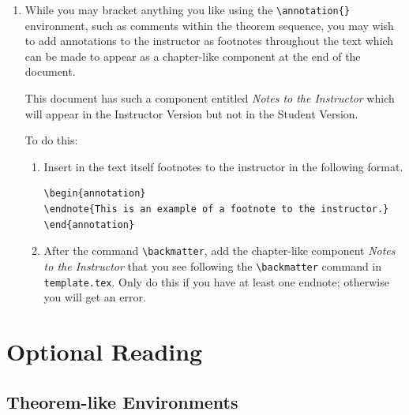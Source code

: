\begin{enumerate}
 \item While you may bracket anything you like using the \verb|\annotation{}| environment,
       such as comments within the theorem sequence, you may wish to add annotations
       to the instructor as footnotes throughout the text which can be made to appear as a chapter-like
       component at the end of the document.
\begin{annotation}
\end{annotation}
       This document has such a
       component entitled \emph{Notes to the Instructor} which will appear in the
       Instructor Version but not in the Student Version.
\begin{annotation}
\end{annotation}
       To do this:
       \begin{enumerate}
        \item  Insert in the text itself footnotes to the instructor
              in the following format.
\begin{verbatim}
\begin{annotation}
\endnote{This is an example of a footnote to the instructor.}
\end{annotation}
\end{verbatim}
        \item After the command \verb|\backmatter|, add the chapter-like component
              \emph{Notes to the Instructor} that you see following the
              \verb|\backmatter| command in \texttt{template.tex}.  Only do this if you have at
              least one endnote; otherwise you will get an error.
       \end{enumerate}
\end{enumerate}



\chapter{Optional Reading}

\section{Theorem-like Environments}

